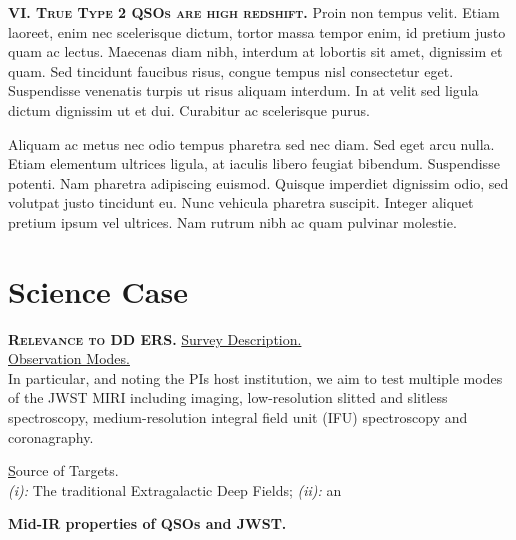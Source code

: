 \documentclass[11pt,epsf]{article}
\begin{document}
\medskip
\medskip

\smallskip
\smallskip
\noindent
\textbf{\textsc{VI. True Type 2 QSOs are high redshift.}} 
Proin non tempus velit. Etiam laoreet, enim nec scelerisque dictum,
tortor massa tempor enim, id pretium justo quam ac lectus. Maecenas
diam nibh, interdum at lobortis sit amet, dignissim et quam. Sed
tincidunt faucibus risus, congue tempus nisl consectetur
eget. Suspendisse venenatis turpis ut risus aliquam interdum. In at
velit sed ligula dictum dignissim ut et dui. Curabitur ac scelerisque
purus.

\noindent
Aliquam ac metus nec odio tempus pharetra sed nec diam. Sed eget arcu
nulla. Etiam elementum ultrices ligula, at iaculis libero feugiat
bibendum. Suspendisse potenti. Nam pharetra adipiscing
euismod. Quisque imperdiet dignissim odio, sed volutpat justo
tincidunt eu. Nunc vehicula pharetra suscipit. Integer aliquet pretium
ipsum vel ultrices. Nam rutrum nibh ac quam pulvinar molestie.


\newpage
\medskip
\medskip
\section{Science Case}

\smallskip
\smallskip
\noindent
\textbf{\textsc{Relevance to DD ERS.}} 
\underline{Survey Description.}\\

\smallskip
\smallskip
\noindent
\underline{Observation Modes.}\\
In particular, and noting the PIs host institution, we aim to test
multiple modes of the JWST MIRI including imaging, low-resolution
slitted and slitless spectroscopy, medium-resolution integral field
unit (IFU) spectroscopy and coronagraphy.

\smallskip
\smallskip
\noindent
{\underline Source of Targets.}\\
{\it (i):} The traditional Extragalactic Deep Fields; 
{\it (ii):} an



\smallskip
\smallskip
\noindent
{\bf Mid-IR properties of QSOs and JWST.} 
\end{document}

